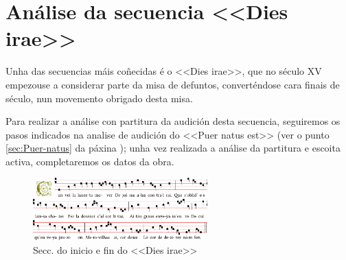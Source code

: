 %
%
\section{Análise da secuencia <<Dies irae>>} \label{Intro}
%
Unha das secuencias máis coñecidas é o <<Dies irae>>, que no século XV empezouse a considerar parte da misa de defuntos, converténdose cara finais de século, nun movemento obrigado desta misa.

Para realizar a análise con partitura da audición desta secuencia, seguiremos os pasos indicados na analise de audición do <<Puer natus est>>  (ver o punto \ref{sec:Puer-natus} da páxina \pageref{sec:Puer-natus}); unha vez realizada a análise da partitura e escoita activa, completaremos os datos da obra.
\par
\vspace*{0.15cm}
%
\begin{figure}[h]
    \centering
    \includegraphics[width=0.60\textwidth]{figures/audicions/can-vei.pdf}
    \caption{Secc. do inicio e fin do <<Dies irae>>}
    \label{fig:dies-irae}
\end{figure}
%
%

%


